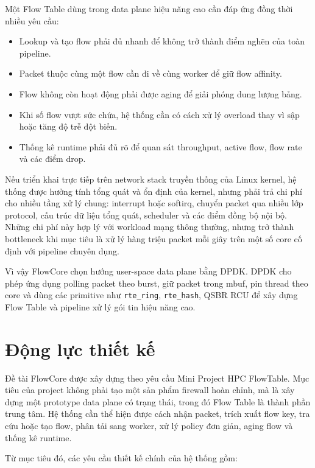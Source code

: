 \documentclass[12pt,a4paper]{report}
\DeclareRobustCommand{\code}[1]{{\small\texttt{#1}}}
\begin{document}
Một Flow Table dùng trong data plane hiệu năng cao cần đáp ứng đồng thời nhiều yêu cầu:

\begin{itemize}
    \item Lookup và tạo flow phải đủ nhanh để không trở thành điểm nghẽn của toàn pipeline.
    \item Packet thuộc cùng một flow cần đi về cùng worker để giữ flow affinity.
    \item Flow không còn hoạt động phải được aging để giải phóng dung lượng bảng.
    \item Khi số flow vượt sức chứa, hệ thống cần có cách xử lý overload thay vì sập hoặc tăng độ trễ đột biến.
    \item Thống kê runtime phải đủ rõ để quan sát throughput, active flow, flow rate và các điểm drop.
\end{itemize}

Nếu triển khai trực tiếp trên network stack truyền thống của Linux kernel, hệ thống được hưởng tính tổng quát và ổn định của kernel, nhưng phải trả chi phí cho nhiều tầng xử lý chung: interrupt hoặc softirq, chuyển packet qua nhiều lớp protocol, cấu trúc dữ liệu tổng quát, scheduler và các điểm đồng bộ nội bộ. Những chi phí này hợp lý với workload mạng thông thường, nhưng trở thành bottleneck khi mục tiêu là xử lý hàng triệu packet mỗi giây trên một số core cố định với pipeline chuyên dụng.

Vì vậy FlowCore chọn hướng user-space data plane bằng DPDK. DPDK cho phép ứng dụng polling packet theo burst, giữ packet trong mbuf, pin thread theo core và dùng các primitive như \code{rte\_ring}, \code{rte\_hash}, QSBR RCU để xây dựng Flow Table và pipeline xử lý gói tin hiệu năng cao.

\section{Động lực thiết kế}

Đề tài FlowCore được xây dựng theo yêu cầu Mini Project HPC FlowTable. Mục tiêu của project không phải tạo một sản phẩm firewall hoàn chỉnh, mà là xây dựng một prototype data plane có trạng thái, trong đó Flow Table là thành phần trung tâm. Hệ thống cần thể hiện được cách nhận packet, trích xuất flow key, tra cứu hoặc tạo flow, phân tải sang worker, xử lý policy đơn giản, aging flow và thống kê runtime.

Từ mục tiêu đó, các yêu cầu thiết kế chính của hệ thống gồm:
\end{document}
